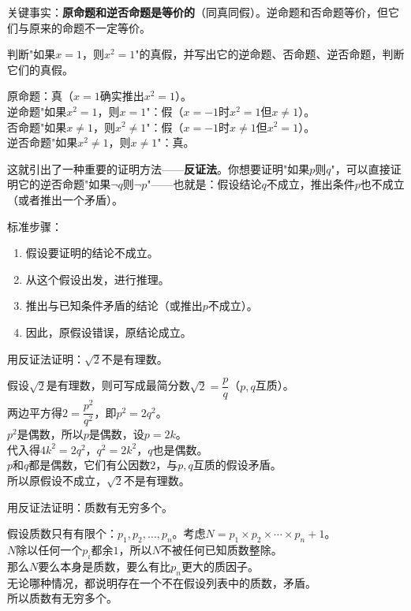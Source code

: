 关键事实：\textbf{原命题和逆否命题是等价的}（同真同假）。逆命题和否命题等价，但它们与原来的命题不一定等价。

\begin{example}
判断"如果$x=1$，则$x^2=1$"的真假，并写出它的逆命题、否命题、逆否命题，判断它们的真假。
\end{example}
\begin{solution}
原命题：真（$x=1$确实推出$x^2=1$）。\\
逆命题"如果$x^2=1$，则$x=1$"：假（$x=-1$时$x^2=1$但$x\neq1$）。\\
否命题"如果$x\neq1$，则$x^2\neq1$"：假（$x=-1$时$x\neq1$但$x^2=1$）。\\
逆否命题"如果$x^2\neq1$，则$x\neq1$"：真。
\end{solution}

这就引出了一种重要的证明方法——\textbf{反证法}。你想要证明"如果$p$则$q$"，可以直接证明它的逆否命题"如果$\lnot q$则$\lnot p$"——也就是：假设结论$q$不成立，推出条件$p$也不成立（或者推出一个矛盾）。

标准步骤：
\begin{enumerate}
\item 假设要证明的结论不成立。
\item 从这个假设出发，进行推理。
\item 推出与已知条件矛盾的结论（或推出$p$不成立）。
\item 因此，原假设错误，原结论成立。
\end{enumerate}

\begin{example}
用反证法证明：$\sqrt2$不是有理数。
\end{example}
\begin{solution}
假设$\sqrt2$是有理数，则可写成最简分数$\sqrt2=\dfrac{p}{q}$（$p,q$互质）。\\
两边平方得$2=\dfrac{p^2}{q^2}$，即$p^2=2q^2$。\\
$p^2$是偶数，所以$p$是偶数，设$p=2k$。\\
代入得$4k^2=2q^2$，$q^2=2k^2$，$q$也是偶数。\\
$p$和$q$都是偶数，它们有公因数$2$，与$p,q$互质的假设矛盾。\\
所以原假设不成立，$\sqrt2$不是有理数。
\end{solution}

\begin{example}
用反证法证明：质数有无穷多个。
\end{example}
\begin{solution}
假设质数只有有限个：$p_1,p_2,\dots,p_n$。考虑$N=p_1\times p_2\times\cdots\times p_n+1$。\\
$N$除以任何一个$p_i$都余$1$，所以$N$不被任何已知质数整除。\\
那么$N$要么本身是质数，要么有比$p_n$更大的质因子。\\
无论哪种情况，都说明存在一个不在假设列表中的质数，矛盾。\\
所以质数有无穷多个。
\end{solution}

